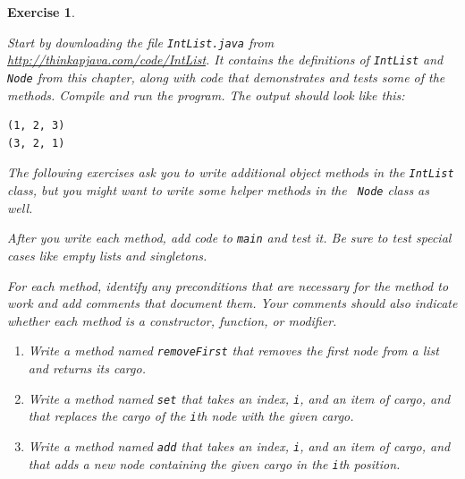 \documentclass[12pt]{book}
\theoremstyle{exercise}
\newtheorem{exercise}{Exercise}[chapter]
\begin{document}
\begin{exercise}
\label{ex.list}

Start by downloading the file {\tt IntList.java} from
\url{http://thinkapjava.com/code/IntList}.  It contains
the definitions of {\tt IntList} and {\tt Node} from this chapter,
along with code that demonstrates and tests some of the methods.
Compile and run the program.  The output should look like this:

\begin{verbatim}
(1, 2, 3)
(3, 2, 1)
\end{verbatim}

The following exercises ask you to write additional object
methods in the {\tt IntList}
class, but you might want to write some helper methods in the {\tt
Node} class as well.

After you write each method, add code to {\tt main}
and test it.  Be sure to test special cases like empty lists and
singletons.

For each method, identify any preconditions that are necessary
for the method to work and add comments that document them.  Your
comments should also indicate whether each method is a constructor,
function, or modifier.

\begin{enumerate}

\item Write a method named {\tt removeFirst} that removes
the first node from a list and returns its cargo.

\item Write a method named {\tt set} that takes an index, {\tt i}, and
an item of cargo, and that replaces the cargo of the {\tt i}th node
with the given cargo.

\item Write a method named {\tt add} that takes an index, {\tt i}, and
an item of cargo, and that adds a new node containing the given cargo
in the {\tt i}th position.




\end{enumerate}
\end{exercise}
\end{document}
